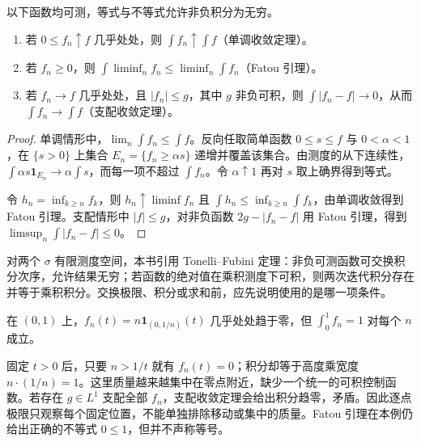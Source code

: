 \documentclass[UTF8,12pt,a4paper,fontset=fandol]{ctexbook}
\begin{document}
\begin{theorem}[三个收敛工具]\label{thm:fa-measure-convergence}
以下函数均可测，等式与不等式允许非负积分为无穷。
\begin{enumerate}
 \item 若 $0\leq f_n\uparrow f$ 几乎处处，则 $\int f_n\uparrow\int f$（单调收敛定理）。
 \item 若 $f_n\geq0$，则 $\int\liminf_nf_n\leq\liminf_n\int f_n$（Fatou 引理）。
 \item 若 $f_n\to f$ 几乎处处，且 $|f_n|\leq g$，其中 $g$ 非负可积，则 $\int|f_n-f|\to0$，从而 $\int f_n\to\int f$（支配收敛定理）。
\end{enumerate}
\end{theorem}
\begin{proof}
单调情形中，$\lim_n\int f_n\leq\int f$。反向任取简单函数 $0\leq s\leq f$ 与 $0<\alpha<1$，在 $\{s>0\}$ 上集合 $E_n=\{f_n\geq\alpha s\}$ 递增并覆盖该集合。由测度的从下连续性，$\int\alpha s\mathbf1_{E_n}\to\alpha\int s$，而每一项不超过 $\int f_n$。令 $\alpha\uparrow1$ 再对 $s$ 取上确界得到等式。

令 $h_n=\inf_{k\geq n}f_k$，则 $h_n\uparrow\liminf f_n$ 且 $\int h_n\leq\inf_{k\geq n}\int f_k$，由单调收敛得到 Fatou 引理。支配情形中 $|f|\leq g$，对非负函数 $2g-|f_n-f|$ 用 Fatou 引理，得到 $\limsup_n\int|f_n-f|\leq0$。
\end{proof}
对两个 $\sigma$ 有限测度空间，本书引用 Tonelli--Fubini 定理：非负可测函数可交换积分次序，允许结果无穷；若函数的绝对值在乘积测度下可积，则两次迭代积分存在并等于乘积积分。交换极限、积分或求和前，应先说明使用的是哪一项条件。

\begin{example}[为什么极限与积分不能随意交换]
在 $(0,1)$ 上，$f_n(t)=n\mathbf1_{(0,1/n)}(t)$ 几乎处处趋于零，但 $\int_0^1f_n=1$ 对每个 $n$ 成立。
\end{example}
\begin{solve}
固定 $t>0$ 后，只要 $n>1/t$ 就有 $f_n(t)=0$；积分却等于高度乘宽度 $n\cdot(1/n)=1$。这里质量越来越集中在零点附近，缺少一个统一的可积控制函数。若存在 $g\in L^1$ 支配全部 $f_n$，支配收敛定理会给出积分趋零，矛盾。因此逐点极限只观察每个固定位置，不能单独排除移动或集中的质量。Fatou 引理在本例仍给出正确的不等式 $0\leq1$，但并不声称等号。
\end{solve}
\end{document}
